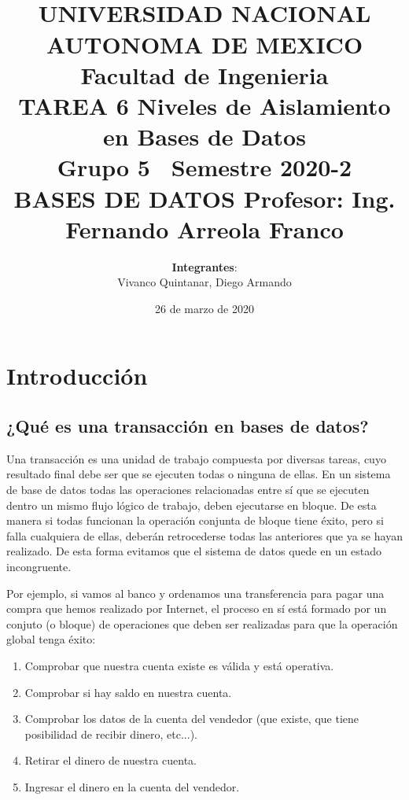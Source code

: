 \documentclass[spanish]{article}
\begin{document}
\title{
\\
UNIVERSIDAD NACIONAL AUTONOMA DE MEXICO\\
\vfill
Facultad de Ingenieria\\
\vfill
{\bfseries TAREA 6}
\vfill
{\bfseries Niveles de Aislamiento en Bases de Datos }
\vfill
\\Grupo 5\
\vfill
Semestre 2020-2\\
\vfill
BASES DE DATOS
\vfill
Profesor: Ing. Fernando Arreola Franco}
\vfill
\author{\textbf{Integrantes}:\\
Vivanco Quintanar, Diego Armando\\}
\date{26 de marzo de 2020}
\maketitle
\newpage
\section{Introducción}
\subsection{¿Qué es una transacción en bases de datos?}

Una transacción es una unidad de trabajo compuesta por diversas tareas, cuyo resultado final debe ser que se ejecuten todas o ninguna de ellas.
En un sistema de base de datos todas las operaciones relacionadas entre sí que se ejecuten dentro un mismo flujo lógico de trabajo, deben ejecutarse en bloque. De esta manera si todas funcionan la operación conjunta de bloque tiene éxito, pero si falla cualquiera de ellas, deberán retrocederse todas las anteriores que ya se hayan realizado. De esta forma evitamos que el sistema de datos quede en un estado incongruente.
    
Por ejemplo, si vamos al banco y ordenamos una transferencia para pagar una compra que hemos realizado por Internet, el proceso en sí está formado por un conjuto (o bloque) de operaciones que deben ser realizadas para que la operación global tenga éxito:

\begin{enumerate}
    \item Comprobar que nuestra cuenta existe es válida y está operativa.
    \item Comprobar si hay saldo en nuestra cuenta.
    \item Comprobar los datos de la cuenta del vendedor (que existe, que tiene posibilidad de recibir dinero, etc...).
    \item Retirar el dinero de nuestra cuenta.
    \item Ingresar el dinero en la cuenta del vendedor.
\end{enumerate}
\end{document}
